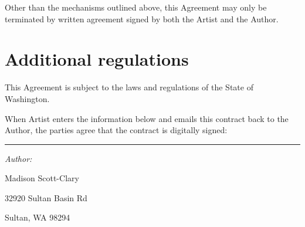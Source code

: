 \documentclass[12pt,letterpaper]{article}
\def\lbl#1{\hbox to 4cm{#1\dotfill\strut}}%
\def\labelline#1#2{\lbl{#1}\vbox{\hbox{\TextField[name=#1,width=#2]{\null}}\kern2pt\hrule}}
\def\q#1{\hbox to \hsize{\labelline{#1}{\longline}}\vskip1.4ex}
\begin{document}
Other than the mechanisms outlined above, this Agreement may only be terminated by written agreement signed by both the Artist and the Author.

\section{Additional regulations}

This Agreement is subject to the laws and regulations of the State of Washington.

\newpage

When Artist enters the information below and emails this contract back to the Author, the parties agree that the contract is digitally signed:


\hrule

\vspace{12pt}

\noindent \textit{Author:}

Madison Scott-Clary

32920 Sultan Basin Rd

Sultan, WA 98294

%
%
%
\end{document}
